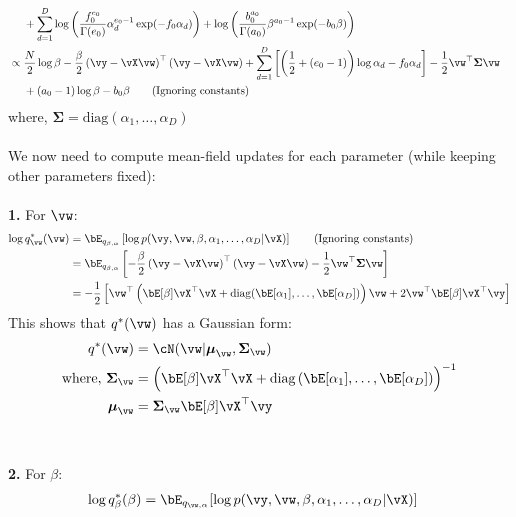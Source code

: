 \documentclass[a4paper,11pt]{article}
\begin{document}
\begin{pmisolution}
\begin{align}
    \nonumber
    \\ & ~~~~ + \sum_{d=1}^D \log \left( \frac{f_0^{e_0}}{\Gamma(e_0)} \alpha_d^{e_0 - 1} \exp(- f_0 \alpha_d) \right) + \log \left( \frac{b_0^{a_0}}{\Gamma(a_0)} \beta^{a_0 - 1} \exp(- b_0 \beta) \right)
    \nonumber
    \\&\propto \frac{N}{2} \log \beta - \frac{\beta}{2} \left(\vy - \vX\vw\right)^\top\left(\vy - \vX\vw\right) + \sum_{d=1}^D \left[ \left(\frac{1}{2} + (e_0-1) \right) \log \alpha_d  -f_0 \alpha_d \right] -\frac{1}{2}\vw^\top \boldsymbol{\Sigma} \vw
    \nonumber\\
    & ~~~~  + (a_0 -1) \log \beta - b_0 \beta \tag{Ignoring constants}
    \nonumber
\end{align}
where, $\boldsymbol{\Sigma} = \text{diag}(\alpha_1, \ldots, \alpha_D)$
\\ \\
\noindent We now need to compute mean-field updates for each parameter (while keeping other parameters fixed):
\\ \\
\noindent \textbf{1. } For $\vw$:
\begin{align*}
    \log q_{\vw}^*(\vw) &= \bE_{q_{\beta, \alpha}} \left[ \log p(\vy, \vw, \beta, \alpha_1, \ldots, \alpha_D| \vX) \right] \tag{Ignoring constants} \\
    &= \bE_{q_{\beta, \alpha}} \left[ - \frac{\beta}{2}  \left(\vy - \vX\vw\right)^\top\left(\vy - \vX\vw\right) - \frac{1}{2}\vw^\top \boldsymbol{\Sigma} \vw \right]\\
    &= -\frac{1}{2} \left[ \vw^\top \left( \bE[\beta] \vX^\top\vX + \text{diag}(\bE[\alpha_1], \ldots, \bE[\alpha_D]) \right) \vw + 2\vw^\top \bE[\beta]  \vX^\top\vy \right]
\end{align*}
This shows that $q^*(\vw)$ has a Gaussian form: 
\begin{align*}
    q^*(\vw) &= \cN(\vw | \boldsymbol{\mu}_{\vw}, \boldsymbol{\Sigma}_{\vw})\\
    \text{where, } \boldsymbol{\Sigma}_{\vw} &= \left( \bE[\beta] \vX^\top\vX + \text{diag}\left(\bE[\alpha_1], \ldots, \bE[\alpha_D]\right) \right)^{-1}\\
    \boldsymbol{\mu}_{\vw} &= \boldsymbol{\Sigma}_{\vw} \bE[\beta]  \vX^\top\vy
\end{align*}
\\ \\
\noindent \textbf{2. } For $\beta$:
\begin{align*}
     \log q_{\beta}^*(\beta) &= \bE_{q_{\vw, \alpha}} [ \log p(\vy, \vw, \beta, \alpha_1, \ldots, \alpha_D| \vX) ]

\end{align*}
\end{pmisolution}
\end{document}
